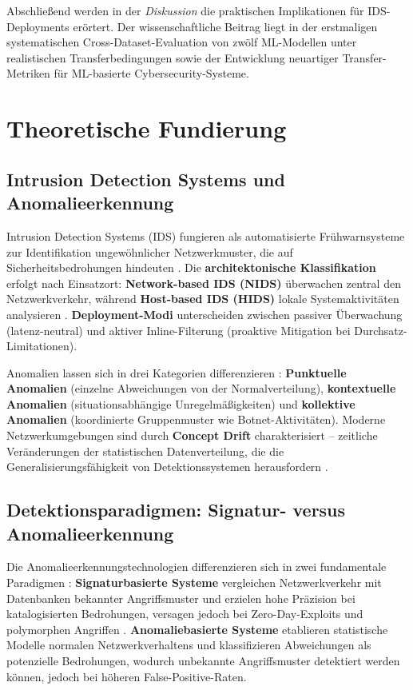 \documentclass[11pt,a4paper]{article}
\begin{document}
    Abschließend werden in der \textit{Diskussion} die praktischen Implikationen für IDS-Deployments erörtert. Der wissenschaftliche Beitrag liegt in der erstmaligen systematischen Cross-Dataset-Evaluation von zwölf ML-Modellen unter realistischen Transferbedingungen sowie der Entwicklung neuartiger Transfer-Metriken für ML-basierte Cybersecurity-Systeme.


    \section{Theoretische Fundierung}

    \subsection{Intrusion Detection Systems und Anomalieerkennung}

    Intrusion Detection Systems (IDS) fungieren als automatisierte Frühwarnsysteme zur Identifikation ungewöhnlicher Netzwerkmuster, die auf Sicherheitsbedrohungen hindeuten \parencite{Ring2019,Vinayakumar2019}. Die \textbf{architektonische Klassifikation} erfolgt nach Einsatzort: \textbf{Network-based IDS (NIDS)} überwachen zentral den Netzwerkverkehr, während \textbf{Host-based IDS (HIDS)} lokale Systemaktivitäten analysieren \parencite{Gharib2016}. \textbf{Deployment-Modi} unterscheiden zwischen passiver Überwachung (latenz-neutral) und aktiver Inline-Filterung (proaktive Mitigation bei Durchsatz-Limitationen).

    Anomalien lassen sich in drei Kategorien differenzieren \parencite{Ring2019}: \textbf{Punktuelle Anomalien} (einzelne Abweichungen von der Normalverteilung), \textbf{kontextuelle Anomalien} (situationsabhängige Unregelmäßigkeiten) und \textbf{kollektive Anomalien} (koordinierte Gruppenmuster wie Botnet-Aktivitäten). Moderne Netzwerkumgebungen sind durch \textbf{Concept Drift} charakterisiert – zeitliche Veränderungen der statistischen Datenverteilung, die die Generalisierungsfähigkeit von Detektionssystemen herausfordern \parencite{Gharib2016}.


    \subsection{Detektionsparadigmen: Signatur- versus Anomalieerkennung}

    Die Anomalieerkennungstechnologien differenzieren sich in zwei fundamentale Paradigmen \parencite{Ring2019,Belavagi2016}: \textbf{Signaturbasierte Systeme} vergleichen Netzwerkverkehr mit Datenbanken bekannter Angriffsmuster und erzielen hohe Präzision bei katalogisierten Bedrohungen, versagen jedoch bei Zero-Day-Exploits und polymorphen Angriffen \parencite{Vinayakumar2019}. \textbf{Anomaliebasierte Systeme} etablieren statistische Modelle normalen Netzwerkverhaltens und klassifizieren Abweichungen als potenzielle Bedrohungen, wodurch unbekannte Angriffsmuster detektiert werden können, jedoch bei höheren False-Positive-Raten.
\end{document}
